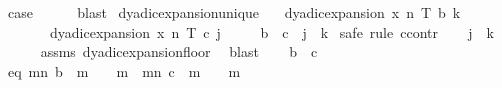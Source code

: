 \begin{isabellebody}
\ {\isacharquery}{\kern0pt}case\isanewline
\ \ \ \ \isamarkupfalse%
\ blast\isanewline
{}\isamarkupfalse%
%
\endisatagproof
{\isafoldproof}%
%
\isadelimproof
\isanewline
%
\endisadelimproof
\isanewline
{}\isamarkupfalse%
\ dyadic{\isacharunderscore}{\kern0pt}expansion{\isacharunderscore}{\kern0pt}unique{\isacharcolon}{\kern0pt}\isanewline
\ \ \ {\isachardoublequoteopen}dyadic{\isacharunderscore}{\kern0pt}expansion\ x\ n\ T\ b\ k{\isachardoublequoteclose}\isanewline
\ \ \ \ \ \ \ {\isachardoublequoteopen}dyadic{\isacharunderscore}{\kern0pt}expansion\ x\ n\ T\ c\ j{\isachardoublequoteclose}\isanewline
\ \ \ \ \ {\isachardoublequoteopen}b\ {\isacharequal}{\kern0pt}\ c\ {\isasymand}\ j\ {\isacharequal}{\kern0pt}\ k{\isachardoublequoteclose}\isanewline
%
\isadelimproof
%
\endisadelimproof
%
\isatagproof
{}\isamarkupfalse%
\ {\isacharparenleft}{\kern0pt}safe{\isacharcomma}{\kern0pt}\ rule\ ccontr{\isacharparenright}{\kern0pt}\isanewline
\ \ \isamarkupfalse%
\ {\isachardoublequoteopen}j\ {\isacharequal}{\kern0pt}\ k{\isachardoublequoteclose}\isanewline
\ \ \ \ \isamarkupfalse%
\ assms\ dyadic{\isacharunderscore}{\kern0pt}expansion{\isacharunderscore}{\kern0pt}floor\ \isamarkupfalse%
\ blast\isanewline
\ \ \isamarkupfalse%
\ {\isachardoublequoteopen}b\ {\isasymnoteq}\ c{\isachardoublequoteclose}\isanewline
\ \ \isamarkupfalse%
\ eq{\isacharcolon}{\kern0pt}\ {\isachardoublequoteopen}{\isacharparenleft}{\kern0pt}{\isasymSum}m{\isasymin}{\isacharbraceleft}{\kern0pt}{}{\isachardot}{\kern0pt}{\isachardot}{\kern0pt}n{\isacharbraceright}{\kern0pt}{\isachardot}{\kern0pt}\ {\isacharparenleft}{\kern0pt}b\ {\isacharbang}{\kern0pt}\ {\isacharparenleft}{\kern0pt}m{\isacharminus}{\kern0pt}{}{\isacharparenright}{\kern0pt}{\isacharparenright}{\kern0pt}\ {\isacharslash}{\kern0pt}\ {}\ {\isacharcircum}{\kern0pt}\ m{\isacharparenright}{\kern0pt}\ {\isacharequal}{\kern0pt}\ {\isacharparenleft}{\kern0pt}{\isasymSum}m{\isasymin}{\isacharbraceleft}{\kern0pt}{}{\isachardot}{\kern0pt}{\isachardot}{\kern0pt}n{\isacharbraceright}{\kern0pt}{\isachardot}{\kern0pt}\ {\isacharparenleft}{\kern0pt}c\ {\isacharbang}{\kern0pt}\ {\isacharparenleft}{\kern0pt}m{\isacharminus}{\kern0pt}{}{\isacharparenright}{\kern0pt}{\isacharparenright}{\kern0pt}\ {\isacharslash}{\kern0pt}\ {}\ {\isacharcircum}{\kern0pt}\ m{\isacharparenright}{\kern0pt}{\isachardoublequoteclose}\isanewline

\end{isabellebody}
